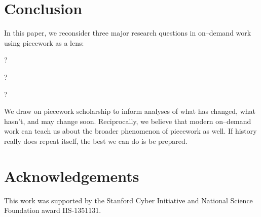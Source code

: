 \documentclass[trackingWork]{subfiles}
\begin{document}
\section{Conclusion}
In this paper, we reconsider three major research questions in on--demand work using piecework as a lens:
\begin{inlinelist}
  \item {}?
  \item {}?
  \item {}?
\end{inlinelist}
We draw on piecework scholarship to inform analyses of what has changed, what hasn't, and may change soon.
Reciprocally, we believe that modern on--demand work can teach us about the broader phenomenon of piecework as well.
If history really does repeat itself, the best we can do is be prepared.

\section{Acknowledgements}
This work was supported by the Stanford Cyber Initiative and National Science Foundation award IIS-1351131.
\end{document}
